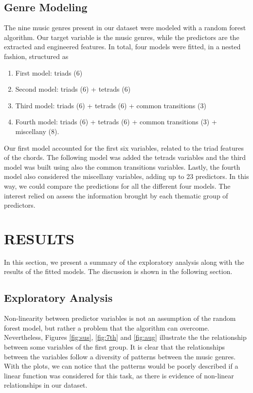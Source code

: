 \documentclass[twocolumn]{article}
\begin{document}
\subsection{Genre Modeling}

The nine music genres present in our dataset 
were modeled with a random forest algorithm. Our target
variable is the music genres, while the predictors are 
the extracted and engineered features. In total, 
four models were fitted, in a nested fashion, structured
as

\begin{enumerate}
    \item First model: triads (6)
    \item Second model: triads (6) + tetrads (6)
    \item Third model: triads (6) + tetrads (6) + common transitions (3)
    \item Fourth model: triads (6) + tetrads (6) +
        common transitions (3) + miscellany (8).
\end{enumerate}

Our first model accounted for the first
six variables, related to the triad features of the chords. The following model was
added the tetrads variables and the third model
was built using also the common
transitions variables. Lastly, the fourth
model also considered the miscellany variables, 
adding up to 23 predictors. In this way, we could  
compare the predictions for all the different four models. 
The interest relied on assess the information brought 
by each thematic group of predictors. 

\section{RESULTS}

In this section, we present a summary
of the exploratory analysis along with
the results of the fitted models. The discussion
is shown in the following section.

\subsection{Exploratory Analysis}

Non-linearity between predictor variables
is not an assumption of the random
forest model, but rather a problem that
the algorithm can overcome. Nevertheless,
Figures \ref{fig:sus}, \ref{fig:7th}
and \ref{fig:aug} illustrate the 
the relationship between some variables of
the first group. It is clear that
the relationships between the variables
follow a diversity of patterns between
the music genres. With the plots,
we can notice that the patterns 
would be poorly described if a linear
function was considered for this task,
as there is evidence of
non-linear relationships in our dataset.
\end{document}
